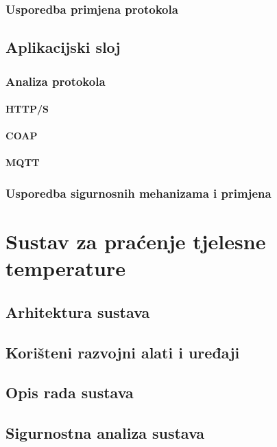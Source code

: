 \documentclass[times, utf8, diplomski]{fer}
\begin{document}
\subsection{Usporedba primjena protokola}

\section{Aplikacijski sloj}

\subsection{Analiza protokola}

\subsubsection{HTTP/S}

\subsubsection{COAP}

\subsubsection{MQTT}

\subsection{Usporedba sigurnosnih mehanizama i primjena}

\chapter{Sustav za praćenje tjelesne temperature}

\section{Arhitektura sustava}

\section{Korišteni razvojni alati i uređaji}

\section{Opis rada sustava}

\section{Sigurnostna analiza sustava}
\end{document}
